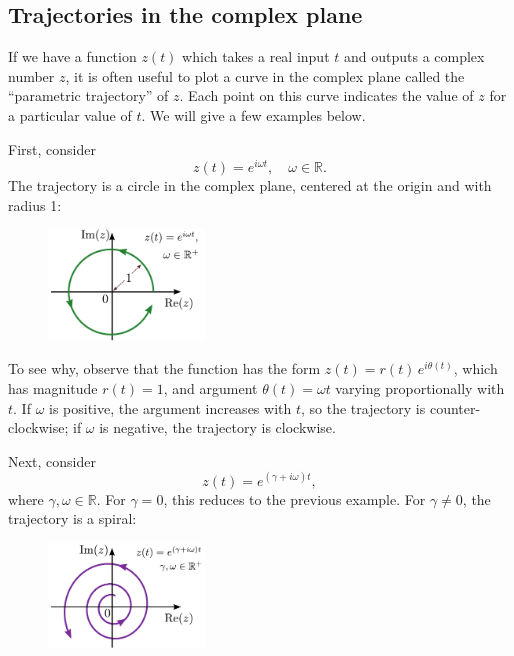\documentclass[10pt,a4paper]{article}
\begin{document}
\subsection{Trajectories in the complex plane}
\label{trajectories-in-the-complex-plane}

If we have a function $z(t)$ which takes a real input $t$ and outputs
a complex number $z$, it is often useful to plot a curve in the
complex plane called the ``parametric trajectory'' of $z$. Each point
on this curve indicates the value of $z$ for a particular value of
$t$. We will give a few examples below.

First, consider
\begin{equation}
z(t) = e^{i\omega t}, \quad \omega \in \mathbb{R}.
\end{equation}
The trajectory is a circle in the complex plane, centered at the origin
and with radius 1:

\begin{figure}[h]
  \centering\includegraphics[width=0.37\textwidth]{complex_trajectory_1}
\end{figure}

To see why, observe that the function has the form $z(t) =
r(t)\,e^{i\theta(t)}$, which has magnitude $r(t) = 1$, and argument
$\theta(t) = \omega t$ varying proportionally with $t$. If $\omega$ is
positive, the argument increases with $t$, so the trajectory is
counter-clockwise; if $\omega$ is negative, the trajectory is
clockwise.

Next, consider
\begin{equation}
z(t) = e^{(\gamma + i \omega) t},
\end{equation}
where $\gamma,\omega \in \mathbb{R}.$ For $\gamma = 0$, this reduces
to the previous example. For $\gamma \ne 0$, the trajectory is a
spiral:

\begin{figure}[h]
  \centering\includegraphics[width=0.37\textwidth]{complex_trajectory_2}
\end{figure}
\end{document}

